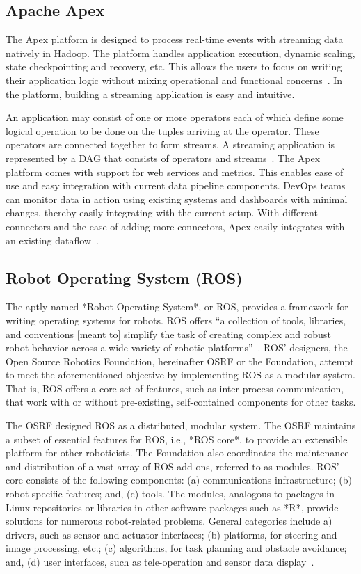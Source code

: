 {\subsection{Apache Apex}

The Apex platform is designed to process real-time events with
streaming data natively in Hadoop. The platform handles application
execution, dynamic scaling, state checkpointing and recovery,
etc. This allows the users to focus on writing their application logic
without mixing operational and functional
concerns~\cite{apache-apex}. In the platform, building a streaming
application is easy and intuitive.

An application may consist of one or more operators each of which
define some logical operation to be done on the tuples arriving at the
operator. These operators are connected together to form streams. A
streaming application is represented by a DAG that consists of
operators and streams~\cite{apex-operators}. The Apex platform comes
with support for web services and metrics. This enables ease of use
and easy integration with current data pipeline components. DevOps
teams can monitor data in action using existing systems and dashboards
with minimal changes, thereby easily integrating with the current
setup. With different connectors and the ease of adding more
connectors, Apex easily integrates with an existing
dataflow~\cite{apex-ease}.

\subsection{Robot Operating System (ROS)}

The aptly-named *Robot Operating System*, or ROS, provides a framework
for writing operating systems for robots.  ROS offers ``a collection
of tools, libraries, and conventions [meant to] simplify the task of
creating complex and robust robot behavior across a wide variety of
robotic platforms''~\cite{www-ros-about}. ROS' designers, the Open
Source Robotics Foundation, hereinafter OSRF or the Foundation,
attempt to meet the aforementioned objective by implementing ROS as a
modular system.  That is, ROS offers a core set of features, such as
inter-process communication, that work with or without pre-existing,
self-contained components for other tasks.

The OSRF designed ROS as a distributed, modular system.  The OSRF
maintains a subset of essential features for ROS, i.e., *ROS core*, to
provide an extensible platform for other roboticists.  The Foundation
also coordinates the maintenance and distribution of a vast array of
ROS add-ons, referred to as modules.  ROS' core consists of the
following components: (a) communications infrastructure; (b)
robot-specific features; and, (c) tools.  The modules, analogous to
packages in Linux repositories or libraries in other software packages
such as *R*, provide solutions for numerous robot-related problems.
General categories include a) drivers, such as sensor and actuator
interfaces; (b) platforms, for steering and image processing, etc.;
(c) algorithms, for task planning and obstacle avoidance; and, (d)
user interfaces, such as tele-operation and sensor data
display~\cite{www-software-categories}.


}
